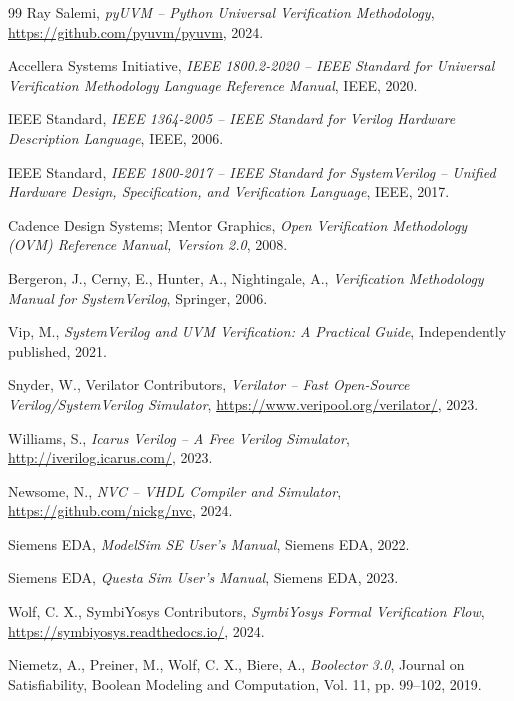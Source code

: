 ﻿\documentclass[12pt,a4paper]{report}
\begin{document}
\begin{thebibliography}{99}
  Ray Salemi,
  \textit{pyUVM -- Python Universal Verification Methodology},
  \url{https://github.com/pyuvm/pyuvm},
  2024.

  Accellera Systems Initiative,
  \textit{IEEE 1800.2-2020 -- IEEE Standard for Universal Verification Methodology
  Language Reference Manual},
  IEEE, 2020.


  IEEE Standard,
  \textit{IEEE 1364-2005 -- IEEE Standard for Verilog Hardware Description Language},
  IEEE, 2006.

  IEEE Standard,
  \textit{IEEE 1800-2017 -- IEEE Standard for SystemVerilog -- Unified Hardware Design,
  Specification, and Verification Language},
  IEEE, 2017.

  Cadence Design Systems; Mentor Graphics,
  \textit{Open Verification Methodology (OVM) Reference Manual, Version 2.0},
  2008.

  Bergeron, J., Cerny, E., Hunter, A., Nightingale, A.,
  \textit{Verification Methodology Manual for SystemVerilog},
  Springer, 2006.

  Vip, M.,
  \textit{SystemVerilog and UVM Verification: A Practical Guide},
  Independently published, 2021.

  Snyder, W., Verilator Contributors,
  \textit{Verilator -- Fast Open-Source Verilog/SystemVerilog Simulator},
  \url{https://www.veripool.org/verilator/},
  2023.

  Williams, S.,
  \textit{Icarus Verilog -- A Free Verilog Simulator},
  \url{http://iverilog.icarus.com/},
  2023.

  Newsome, N.,
  \textit{NVC -- VHDL Compiler and Simulator},
  \url{https://github.com/nickg/nvc},
  2024.

  Siemens EDA,
  \textit{ModelSim SE User's Manual},
  Siemens EDA, 2022.

  Siemens EDA,
  \textit{Questa Sim User's Manual},
  Siemens EDA, 2023.

  Wolf, C. X., SymbiYosys Contributors,
  \textit{SymbiYosys Formal Verification Flow},
  \url{https://symbiyosys.readthedocs.io/},
  2024.

  Niemetz, A., Preiner, M., Wolf, C. X., Biere, A.,
  \textit{Boolector 3.0},
  Journal on Satisfiability, Boolean Modeling and Computation,
  Vol. 11, pp. 99--102, 2019.


\end{thebibliography}
\end{document}
